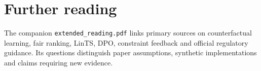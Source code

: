 \documentclass[11pt,oneside]{scrbook}
\begin{document}
\chapter{Further reading}

The companion \texttt{extended\_reading.pdf} links primary sources on
counterfactual learning, fair ranking, LinTS, DPO, constraint feedback and
official regulatory guidance. Its questions distinguish paper assumptions,
synthetic implementations and claims requiring new evidence.
\end{document}
